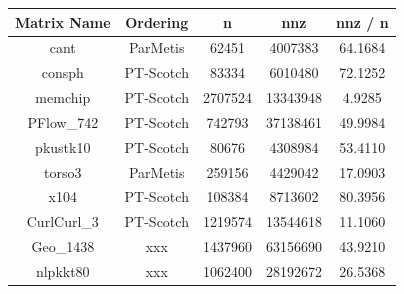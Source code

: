 \begin{table}[htpb]
\centering
\begin{tabular}{|c|c|c|c|c|}
\hline
Matrix Name & Ordering  & n       & nnz      & nnz / n \\ \hline
cant        & ParMetis  & 62451   & 4007383  & 64.1684 \\ \hline
consph      & PT-Scotch & 83334   & 6010480  & 72.1252 \\ \hline
memchip     & PT-Scotch & 2707524 & 13343948 & 4.9285  \\ \hline
PFlow\_742  & PT-Scotch & 742793  & 37138461 & 49.9984 \\ \hline
pkustk10    & PT-Scotch & 80676   & 4308984  & 53.4110 \\ \hline
torso3      & ParMetis  & 259156  & 4429042  & 17.0903 \\ \hline
x104        & PT-Scotch & 108384  & 8713602  & 80.3956 \\ \hline
CurlCurl\_3 & PT-Scotch & 1219574 & 13544618 & 11.1060 \\ \hline
Geo\_1438   & xxx       & 1437960 & 63156690 & 43.9210 \\ \hline
nlpkkt80    & xxx       & 1062400 & 28192672 & 26.5368 \\ \hline
\end{tabular}
\end{table}


